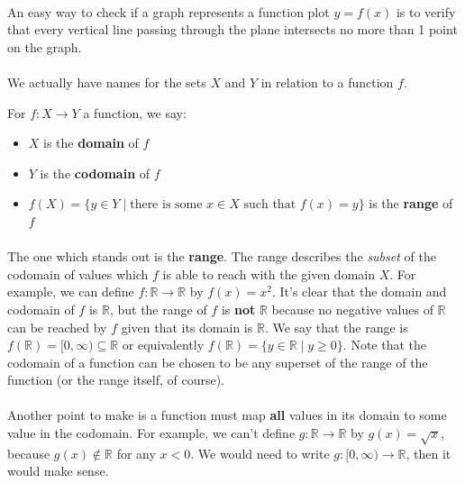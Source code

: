 \documentclass[12pt, a4paper, titlepage, twoside]{article}
\newcommand*{\R}{\mathbb{R}}
\begin{document}
	\paragraph{}
	An easy way to check if a graph represents a function plot $y = f(x)$ is to verify that every vertical line passing through the plane intersects
	no more than 1 point on the graph. 
	
	\paragraph{}
	We actually have names for the sets $X$ and $Y$ in relation to a function $f$.\\
	
	\begin{kp}
		For $f : X \to Y$ a function, we say:
		\begin{itemize}
			\item $X$ is the \textbf{domain} of $f$
			\item $Y$ is the \textbf{codomain} of $f$
			\item $f(X) = \{ y \in Y \; \vert \; \text{there is some } x \in X \text{ such that } f(x) = y \}$
			is the \textbf{range} of $f$
		\end{itemize}
	\end{kp}
	
	\paragraph{}
	The one which stands out is the \textbf{range}. The range describes the \textit{subset} of the codomain of values which $f$ is able to
	reach with the given domain $X$. For example, we can define $f : \R \to \R$ by $f(x) = x^2$. It's clear that the domain and codomain of $f$ is
	$\R$, but the range of $f$ is \textbf{not} $\R$ because no negative values of $\R$ can be reached by $f$ given that its domain is $\R$.
	We say that the range is $f(\R) = [0,\infty) \subseteq \R$ or equivalently $f(\R) = \{ y \in \R \; \vert \; y \geqslant 0 \}$. Note that
	the codomain of a function can be chosen to be any superset of the range of the function (or the range itself, of course).
	
	\paragraph{}
	Another point to make is a function must map \textbf{all} values in its domain to some value in the codomain. For example, we can't define
	$g : \R \to \R$ by $g(x) = \sqrt{x}$, because $g(x) \not\in \R$ for any $x < 0$. We would need to write $g : [0,\infty) \to \R$, then it
	would make sense.\\
	
\end{document}
